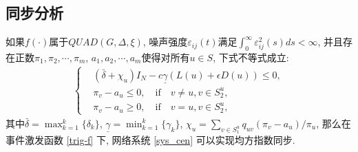 \subsection{同步分析}
        \begin{thm}\label{thm:cen}
            如果$f(\cdot)$属于$QUAD(G,\Delta,\xi)$, 噪声强度$\varepsilon_{ij}(t)$满足$\int_0^\infty\varepsilon_{ij}^2(s)ds<\infty$, 并且存在正数$\pi_1,\pi_2,\cdots,\pi_m$, $a_1,a_2,\cdots,a_m$使得对所有$u\in S$, 下式不等式成立:
            \begin{align}\label{ce-condiction}
            \left\{
            \begin{aligned}
                  &(\bar{\delta}+\chi_u)I_N-c\underline{\gamma}(L(u)+\epsilon D(u))\leq0,\\
                  &\pi_v-a_u\leq0, \quad \text{if}\quad v\neq u, v\in S^u_2,\\
                  &\pi_v-a_u\geq0, \quad \text{if} \quad v= u, v\in S^u_2,
            \end{aligned}
            \right.
            \end{align}
           其中$\bar{\delta}=\max_{k=1}^k\{\delta_k\}$, $\underline{\gamma}=\min_{k=1}^k\{\gamma_k\}$, $\chi_u=\sum_{v\in S_1^u}q_{uv}(\pi_v-a_u)/\pi_u$, 那么在事件激发函数 \eqref{trig-f} 下, 网络系统 \eqref{sys_cen} 可以实现均方指数同步.
        \end{thm}
